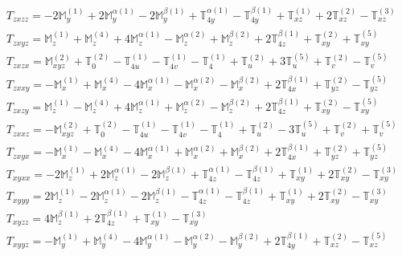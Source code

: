 \documentclass[fleqn,8pt,landscape]{jsarticle}
\begin{document}
\begin{align*}
& T_{zxzz} = - 2 \mathbb{M}_{y}^{(1)} + 2 \mathbb{M}_{y}^{\alpha(1)} - 2 \mathbb{M}_{y}^{\beta(1)} + \mathbb{T}_{4y}^{\alpha(1)} - \mathbb{T}_{4y}^{\beta(1)} + \mathbb{T}_{xz}^{(1)} + 2 \mathbb{T}_{xz}^{(2)} - \mathbb{T}_{xz}^{(3)} \\
& T_{zxyz} = \mathbb{M}_{z}^{(1)} + \mathbb{M}_{z}^{(4)} + 4 \mathbb{M}_{z}^{\alpha(1)} - \mathbb{M}_{z}^{\alpha(2)} + \mathbb{M}_{z}^{\beta(2)} + 2 \mathbb{T}_{4z}^{\beta(1)} + \mathbb{T}_{xy}^{(2)} + \mathbb{T}_{xy}^{(5)} \\
& T_{zxzx} = \mathbb{M}_{xyz}^{(2)} + \mathbb{T}_{0}^{(2)} - \mathbb{T}_{4u}^{(1)} - \mathbb{T}_{4v}^{(1)} - \mathbb{T}_{4}^{(1)} + \mathbb{T}_{u}^{(2)} + 3 \mathbb{T}_{u}^{(5)} + \mathbb{T}_{v}^{(2)} - \mathbb{T}_{v}^{(5)} \\
& T_{zxxy} = - \mathbb{M}_{x}^{(1)} + \mathbb{M}_{x}^{(4)} - 4 \mathbb{M}_{x}^{\alpha(1)} - \mathbb{M}_{x}^{\alpha(2)} - \mathbb{M}_{x}^{\beta(2)} + 2 \mathbb{T}_{4x}^{\beta(1)} + \mathbb{T}_{yz}^{(2)} - \mathbb{T}_{yz}^{(5)} \\
& T_{zxzy} = \mathbb{M}_{z}^{(1)} - \mathbb{M}_{z}^{(4)} + 4 \mathbb{M}_{z}^{\alpha(1)} + \mathbb{M}_{z}^{\alpha(2)} - \mathbb{M}_{z}^{\beta(2)} + 2 \mathbb{T}_{4z}^{\beta(1)} + \mathbb{T}_{xy}^{(2)} - \mathbb{T}_{xy}^{(5)} \\
& T_{zxxz} = - \mathbb{M}_{xyz}^{(2)} + \mathbb{T}_{0}^{(2)} - \mathbb{T}_{4u}^{(1)} - \mathbb{T}_{4v}^{(1)} - \mathbb{T}_{4}^{(1)} + \mathbb{T}_{u}^{(2)} - 3 \mathbb{T}_{u}^{(5)} + \mathbb{T}_{v}^{(2)} + \mathbb{T}_{v}^{(5)} \\
& T_{zxyx} = - \mathbb{M}_{x}^{(1)} - \mathbb{M}_{x}^{(4)} - 4 \mathbb{M}_{x}^{\alpha(1)} + \mathbb{M}_{x}^{\alpha(2)} + \mathbb{M}_{x}^{\beta(2)} + 2 \mathbb{T}_{4x}^{\beta(1)} + \mathbb{T}_{yz}^{(2)} + \mathbb{T}_{yz}^{(5)} \\
& T_{xyxx} = - 2 \mathbb{M}_{z}^{(1)} + 2 \mathbb{M}_{z}^{\alpha(1)} - 2 \mathbb{M}_{z}^{\beta(1)} + \mathbb{T}_{4z}^{\alpha(1)} - \mathbb{T}_{4z}^{\beta(1)} + \mathbb{T}_{xy}^{(1)} + 2 \mathbb{T}_{xy}^{(2)} - \mathbb{T}_{xy}^{(3)} \\
& T_{xyyy} = 2 \mathbb{M}_{z}^{(1)} - 2 \mathbb{M}_{z}^{\alpha(1)} - 2 \mathbb{M}_{z}^{\beta(1)} - \mathbb{T}_{4z}^{\alpha(1)} - \mathbb{T}_{4z}^{\beta(1)} + \mathbb{T}_{xy}^{(1)} + 2 \mathbb{T}_{xy}^{(2)} - \mathbb{T}_{xy}^{(3)} \\
& T_{xyzz} = 4 \mathbb{M}_{z}^{\beta(1)} + 2 \mathbb{T}_{4z}^{\beta(1)} + \mathbb{T}_{xy}^{(1)} - \mathbb{T}_{xy}^{(3)} \\
& T_{xyyz} = - \mathbb{M}_{y}^{(1)} + \mathbb{M}_{y}^{(4)} - 4 \mathbb{M}_{y}^{\alpha(1)} - \mathbb{M}_{y}^{\alpha(2)} - \mathbb{M}_{y}^{\beta(2)} + 2 \mathbb{T}_{4y}^{\beta(1)} + \mathbb{T}_{xz}^{(2)} - \mathbb{T}_{xz}^{(5)} \\

\end{align*}
\end{document}
